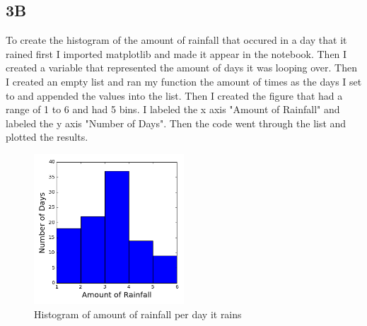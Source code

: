 \documentclass[12pt]{article}
\begin{document}
\subsection{3B}
To create the histogram of the amount of rainfall that occured in a day that it rained first I imported matplotlib and made it appear in the notebook. Then I created a variable that represented the amount of days it was looping over. Then I created an empty list and ran my function the amount of times as the days I set to and appended the values into the list. Then I created the figure that had a range of 1 to 6 and had 5 bins. I labeled the x axis "Amount of Rainfall" and labeled the y axis "Number of Days". Then the code went through the list and plotted the results.

\begin{figure}[h]

\centering
\includegraphics[width=0.5\textwidth]{Histogram.png}
\caption{Histogram of amount of rainfall per day it rains \label{Histogram}}
\end{figure}  
\end{document}
